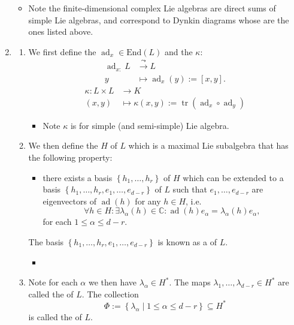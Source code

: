 \documentclass{article}
\begin{document}
\begin{enumerate}
\begin{itemize}
    \item Note the finite-dimensional  complex Lie algebras are direct sums of simple Lie algebras, and correspond to  Dynkin diagrams whose  are the ones listed above.
\end{itemize}

\item {}
\begin{enumerate}
    \item We first define the   $\operatorname{ad}_{x}\in \text{End}(L)$ and the  $\kappa$:
    \begin{align*}
        \operatorname{ad}_{x:} L & \stackrel{\leadsto}{\longrightarrow} L \\ y & \mapsto \operatorname{ad}_{x}(y):=[x, y].
    \end{align*}
    \begin{align*}
        \kappa: L \times L & \rightarrow K \\(x, y) & \mapsto \kappa(x, y):=\operatorname{tr}\left(\operatorname{ad}_{x} \circ \operatorname{ad}_{y}\right) 
    \end{align*}
    \begin{itemize}
        \item Note  $\kappa$ is  for simple (and semi-simple) Lie algebra.
    \end{itemize}
    \item We then define the  $H$ of $L$ which is a maximal Lie subalgebra that 
    has the following property: 

    \begin{itemize}
        \item  there exists a basis $\left\{h_{1}, \ldots, h_{r}\right\}$ of $H$ which can be extended to a basis $\left\{h_{1}, \ldots, h_{r}, e_{1}, \ldots, e_{d-r}\right\}$ of $L$ such that $e_{1}, \ldots, e_{d-r}$ are eigenvectors of $\operatorname{ad}(h)$ for any $h \in H$, i.e.
$$
\forall h \in H: \exists \lambda_{\alpha}(h) \in \mathbb{C:} \operatorname{ad}(h) e_{\alpha}=\lambda_{\alpha}(h) e_{\alpha},
$$
for each $1 \leq \alpha \leq d-r $.
    \end{itemize}

The basis $\left\{h_{1}, \ldots, h_{r}, e_{1}, \ldots, e_{d-r}\right\}$ is known as a  of $L$.
\begin{itemize}
    \item {}
\end{itemize}
\item Note for each $\alpha$ we then have  $\lambda_{\alpha} \in H^{*}$. The maps $\lambda_{1}, \ldots, \lambda_{d-r} \in H^{*}$ are called the  of $L$. The collection
$$
\Phi:=\left\{\lambda_{\alpha} \mid 1 \leq \alpha \leq d-r\right\} \subseteq H^{*}
$$
is called the  of $L$.


\end{enumerate}
\end{enumerate}
\end{document}
